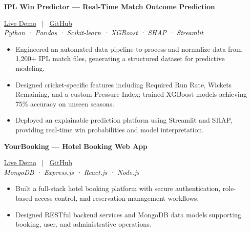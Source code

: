 \documentclass[10pt, a4paper]{article}
\begin{document}
\noindent \textbf{IPL Win Predictor --- Real-Time Match Outcome Prediction} \hfill 

\small{
\href{https://ipl-win-probability-predictor-fpzxwaxr5tepzwdugousfe.streamlit.app/}{Live Demo}
 \ $|$ \ \href{https://github.com/PankajKumar-11/IPL-Win-Probability-Predictor}{GitHub}
}
 \\
\textit{\small{Python · Pandas · Scikit-learn · XGBoost · SHAP · Streamlit}}
\begin{itemize}

    \item Engineered an automated data pipeline to process and normalize data from 1,200+ IPL match files, generating a structured dataset for predictive modeling.

    \item Designed cricket-specific features including Required Run Rate, Wickets Remaining, and a custom Pressure Index; trained XGBoost models achieving 75\% accuracy on unseen seasons.

    \item Deployed an explainable prediction platform using Streamlit and SHAP, providing real-time win probabilities and model interpretation.

\end{itemize}
\vspace{3pt}

\noindent \textbf{YourBooking --- Hotel Booking Web App} \hfill 

\small{
\href{https://yourbookingweb.netlify.app/}{Live Demo}
 \ $|$ \ \href{https://github.com/PankajKumar-11/YourBooking-Hotel-booking-Web-}{GitHub}
}
 \\
\textit{\small{MongoDB · Express.js · React.js · Node.js}}
\begin{itemize}

    \item Built a full-stack hotel booking platform with secure authentication, role-based access control, and reservation management workflows.

    \item Designed RESTful backend services and MongoDB data models supporting booking, user, and administrative operations.

\end{itemize}
\vspace{3pt}


\end{document}
